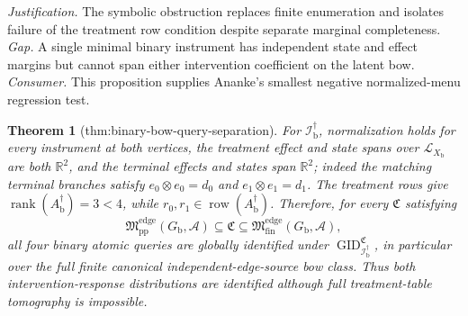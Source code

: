 \documentclass{article}
\newtheorem{theorem}{Theorem}
\begin{document}
\par\smallskip\noindent \textit{Justification.} The symbolic obstruction replaces finite enumeration and isolates failure of the treatment row condition despite separate marginal completeness. \textit{Gap.} A single minimal binary instrument has independent state and effect margins but cannot span either intervention coefficient on the latent bow. \textit{Consumer.} This proposition supplies Ananke's smallest negative normalized-menu regression test.

\begin{theorem}[thm:binary-bow-query-separation]\label{thm:binary-bow-query-separation}
For \(\mathcal I_{\mathrm b}^{\dagger}\), normalization holds for every instrument at both vertices, the treatment effect and state spans over \(\mathcal L_{X_{\mathrm b}}\) are both \(\mathbb R^2\), and the terminal effects and states span \(\mathbb R^2\); indeed the matching terminal branches satisfy \(e_0\otimes e_0=d_0\) and \(e_1\otimes e_1=d_1\).  The treatment rows give \(\operatorname{rank}(A_{\mathrm b}^{\dagger})=3<4\), while \(r_0,r_1\in\operatorname{row}(A_{\mathrm b}^{\dagger})\).  Therefore, for every \(\mathfrak C\) satisfying
\[
\mathfrak M_{\mathrm{pp}}^{\mathrm{edge}}(G_{\mathrm b},\mathcal A)
\subseteq\mathfrak C
\subseteq\mathfrak M_{\mathrm{fin}}^{\mathrm{edge}}(G_{\mathrm b},\mathcal A),
\]
all four binary atomic queries are globally identified under \(\operatorname{GID}_{\mathcal I_{\mathrm b}^{\dagger}}^{\mathfrak C}\), in particular over the full finite canonical independent-edge-source bow class.  Thus both intervention-response distributions are identified although full treatment-table tomography is impossible.
\end{theorem}
\end{document}
